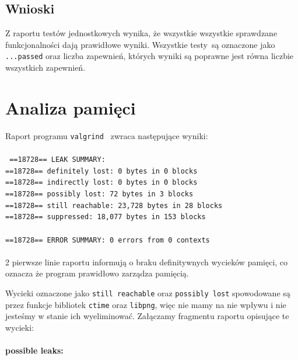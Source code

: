 \documentclass{mwart}
\begin{document}
\subsection{Wnioski}
Z raportu testów jednostkowych wynika, że wszystkie wszystkie sprawdzane funkcjonalności dają prawidłowe wyniki. Wszystkie testy są oznaczone jako \texttt{...passed} oraz liczba zapewnień, których wyniki są poprawne jest równa liczbie wszystkich zapewnień.

\section{Analiza pamięci}
\noindent Raport programu \texttt{valgrind } zwraca następujące wyniki:\\\\
\noindent \texttt{\noindent 
==18728== LEAK SUMMARY:\\
==18728==    definitely lost: 0 bytes in 0 blocks\\
==18728==    indirectly lost: 0 bytes in 0 blocks\\
==18728==      possibly lost: 72 bytes in 3 blocks\\
==18728==    still reachable: 23,728 bytes in 28 blocks\\
==18728==         suppressed: 18,077 bytes in 153 blocks\\
\\
==18728== ERROR SUMMARY: 0 errors from 0 contexts 
}\\\\

2 pierwsze linie raportu informują o braku definitywnych wycieków pamięci, co oznacza że program prawidłowo zarządza pamięcią.

Wycieki oznaczone jako \texttt{still reachable} oraz \texttt{possibly lost} spowodowane są przez funkcje bibliotek \texttt{ctime} oraz \texttt{libpng}, więc nie mamy na nie wpływu i nie jesteśmy w stanie ich wyeliminować. Załączamy fragmentu raportu opisujące te wycieki:\\

\paragraph{possible leaks:} \mbox{}
\end{document}
